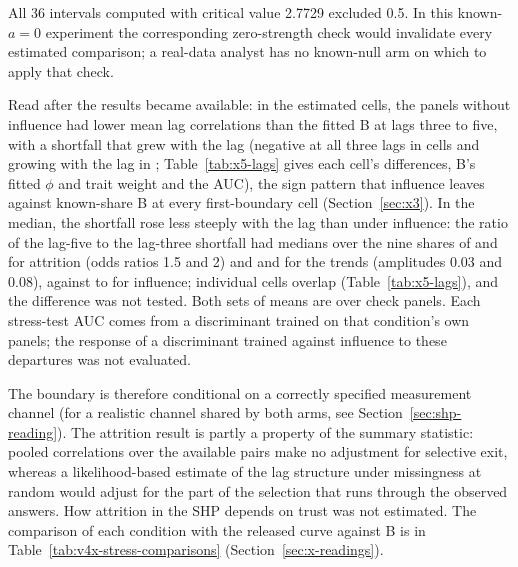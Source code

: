 All 36 intervals computed with critical value 2.7729 excluded 0.5. %
In this known-$a=0$ experiment the corresponding zero-strength check would invalidate every estimated comparison; a real-data analyst has no known-null arm on which to apply that check. %

Read after the results became available: in the  estimated cells, the panels without influence had lower mean lag correlations than the fitted B at lags three to five, with a shortfall that grew with the lag (negative at all three lags in  cells and growing with the lag in ; Table~\ref{tab:x5-lags} gives each cell's differences, B's fitted $\phi$ and trait weight and the AUC), the sign pattern that influence leaves against known-share B at every first-boundary cell (Section~\ref{sec:x3}). In the median, the shortfall rose less steeply with the lag than under influence: the ratio of the lag-five to the lag-three shortfall had medians over the nine shares of  and  for attrition (odds ratios 1.5 and 2) and  and  for the trends (amplitudes 0.03 and 0.08), against  to  for influence; individual cells overlap (Table~\ref{tab:x5-lags}), and the difference was not tested. Both sets of means are over check panels. Each stress-test AUC comes from a discriminant trained on that condition's own panels; the response of a discriminant trained against influence to these departures was not evaluated.



The boundary is therefore conditional on a correctly specified measurement channel (for a realistic channel shared by both arms, see Section~\ref{sec:shp-reading}). The attrition result is partly a property of the summary statistic: pooled correlations over the available pairs make no adjustment for selective exit, whereas a likelihood-based estimate of the lag structure under missingness at random would adjust for the part of the selection that runs through the observed answers. How attrition in the SHP depends on trust was not estimated. The comparison of each condition with the released curve against B is in Table~\ref{tab:v4x-stress-comparisons} (Section~\ref{sec:x-readings}). %

